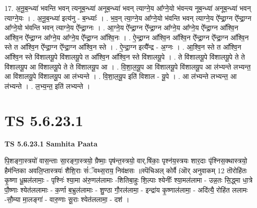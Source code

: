 \documentclass[17pt]{extarticle}
\begin{document}
17. अ॒नू॒ब॒न्ध्या॑ भवन्ति भवन् त्यनूब॒न्ध्या॑ अनूब॒न्ध्या॑ भवन् त्याग्ने॒य आ᳚ग्ने॒यो भ॑वन्त्य नूब॒न्ध्या॑ अनूब॒न्ध्या॑ भवन् त्याग्ने॒यः । . अ॒नू॒ब॒न्ध्या॑ इत्य॑नु - ब॒न्ध्याः᳚ । . भ॒व॒न् त्या॒ग्ने॒य आ᳚ग्ने॒यो भ॑वन्ति भवन् त्याग्ने॒य ऐ᳚न्द्रा॒ग्न ऐ᳚न्द्रा॒ग्न आ᳚ग्ने॒यो भ॑वन्ति भवन् त्याग्ने॒य ऐ᳚न्द्रा॒ग्नः । . आ॒ग्ने॒य ऐ᳚न्द्रा॒ग्न ऐ᳚न्द्रा॒ग्न आ᳚ग्ने॒य आ᳚ग्ने॒य ऐ᳚न्द्रा॒ग्न आ᳚श्वि॒न आ᳚श्वि॒न ऐ᳚न्द्रा॒ग्न आ᳚ग्ने॒य आ᳚ग्ने॒य ऐ᳚न्द्रा॒ग्न आ᳚श्वि॒नः । . ऐ॒न्द्रा॒ग्न आ᳚श्वि॒न आ᳚श्वि॒न ऐ᳚न्द्रा॒ग्न ऐ᳚न्द्रा॒ग्न आ᳚श्वि॒न स्ते त आ᳚श्वि॒न ऐ᳚न्द्रा॒ग्न ऐ᳚न्द्रा॒ग्न आ᳚श्वि॒न स्ते । . ऐ॒न्द्रा॒ग्न इत्यै᳚न्द्र - अ॒ग्नः । . आ॒श्वि॒न स्ते त आ᳚श्वि॒न आ᳚श्वि॒न स्ते वि॑शालयू॒पे वि॑शालयू॒पे त आ᳚श्वि॒न आ᳚श्वि॒न स्ते वि॑शालयू॒पे । . ते वि॑शालयू॒पे वि॑शालयू॒पे ते ते वि॑शालयू॒प आ वि॑शालयू॒पे ते ते वि॑शालयू॒प आ । . वि॒शा॒ल॒यू॒प आ वि॑शालयू॒पे वि॑शालयू॒प आ ल॑भ्यन्ते लभ्यन्त॒ आ वि॑शालयू॒पे वि॑शालयू॒प आ ल॑भ्यन्ते । . वि॒शा॒ल॒यू॒प इति॑ विशाल - यू॒पे । . आ ल॑भ्यन्ते लभ्यन्त॒ आ ल॑भ्यन्ते । . ल॒भ्य॒न्त॒ इति॑ लभ्यन्ते । \newline
\pagebreak
{}

\section{ TS 5.6.23.1 }

\textbf{TS 5.6.23.1 } \newline
\textbf{Samhita Paata} \newline

पि॒शङ्गा॒स्त्रयो॑ वास॒न्ताः सा॒रङ्गा॒स्त्रयो॒ ग्रैष्माः॒ पृष॑न्त॒स्त्रयो॒ वार्.षि॑काः॒ पृश्न॑य॒स्त्रयः शार॒दाः पृ॑श्निस॒क्थास्त्रयो॒ हैम॑न्तिका अवलि॒प्तास्त्रयः॑ शैशि॒राः सं॑ॅवथ्स॒राय॒ निव॑क्षसः ॥स्पॆचिअल् कोर्वै fऒर् अनुवाकम् 12 तॊरोहि॑तः कृ॒ष्णा धू॒म्रल॑लामाः॒ - पृश्निः॑ श्या॒मा अ॑रु॒णल॑लामाः -शितिबा॒हुः शि॒ल्पाः श्येनीः᳚ श्या॒मल॑लामा - उन्न॒तः सि॒द्ध्मा धा॒त्रे पौ॒ष्णाः श्येत॑ललामाः - क॒र्णा ब॒भ्रुल॑लामाः - शु॒ण्ठा गौ॒रल॑लामा॒ - इन्द्रा॑य कृ॒ष्णाल॑लामा॒ - अदि॑त्यै॒ रोहि॑त ललामः -सौ॒म्या मा॒लङ्गा॑ - वारु॒णाः सू॒राः श्येत॑ललामा॒ - दश॑ । \newline
\end{document}
